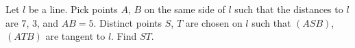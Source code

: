 Let $l$ be a line. Pick points $A$, $B$ on the same side of $l$ such that the distances to $l$ are $7$, $3$, and $AB=5$. Distinct points $S$, $T$ are chosen on $l$ such that $(ASB)$, $(ATB)$ are tangent to $l$. Find $ST$.

